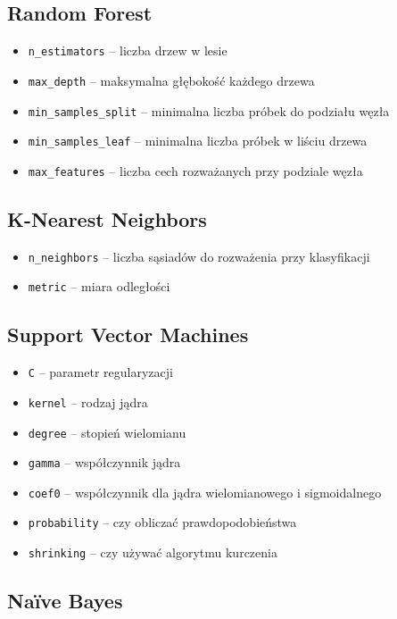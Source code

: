 \documentclass[12pt,titlepage]{article}
\begin{document}
\subsection{Random Forest}
\begin{itemize}
    \item \texttt{n\_estimators} – liczba drzew w lesie
    \item \texttt{max\_depth} – maksymalna głębokość każdego drzewa
    \item \texttt{min\_samples\_split} – minimalna liczba próbek do podziału węzła
    \item \texttt{min\_samples\_leaf} – minimalna liczba próbek w liściu drzewa
    \item \texttt{max\_features} – liczba cech rozważanych przy podziale węzła
    \end{itemize}

\subsection{K-Nearest Neighbors}
\begin{itemize}
    \item \texttt{n\_neighbors} – liczba sąsiadów do rozważenia przy klasyfikacji
    \item \texttt{metric} – miara odległości

\end{itemize}

\subsection{Support Vector Machines}
\begin{itemize}
    \item \texttt{C} – parametr regularyzacji 
    \item \texttt{kernel} – rodzaj jądra
    \item \texttt{degree} – stopień wielomianu 
    \item \texttt{gamma} – współczynnik jądra
    \item \texttt{coef0} – współczynnik dla jądra wielomianowego i sigmoidalnego
    \item \texttt{probability} – czy obliczać prawdopodobieństwa 
    \item \texttt{shrinking} – czy używać algorytmu kurczenia 
\end{itemize}

\subsection{Naïve Bayes}
\end{document}
